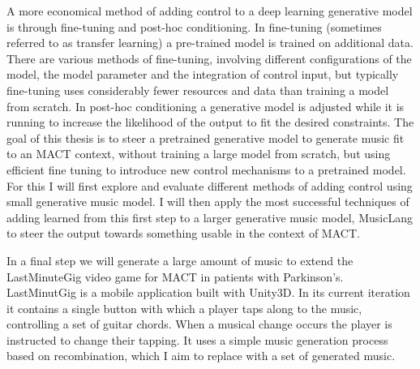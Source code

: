 A more economical method of adding control to a deep learning generative model is through fine-tuning and post-hoc conditioning. In fine-tuning (sometimes referred to as transfer learning) a pre-trained model is trained on additional data. There are various methods of fine-tuning, involving different configurations of the model, the model parameter and  the integration of control input, but typically fine-tuning uses considerably fewer resources and data than training a model from scratch. In post-hoc conditioning a generative model is adjusted while it is running to increase the likelihood of the output to fit the desired constraints. The goal of this thesis is to steer a pretrained generative model to generate music fit to an MACT context, without training a large model from scratch, but using efficient fine tuning to introduce new control mechanisms to a pretrained model. For this I will first explore and evaluate different methods of adding control using small generative music model. I will then apply the most successful techniques of adding learned from this first step to a larger generative music model, MusicLang to steer the output towards something usable in the context of MACT. 

In a final step we will generate a large amount of music to extend the LastMinuteGig video game for MACT in patients with Parkinson's. LastMinutGig is a mobile application built with Unity3D. In its current iteration it contains a single button with which a player taps along to the music, controlling a set of guitar chords. When a musical change occurs the player is instructed to change their tapping. It uses a simple music generation process based on recombination, which I aim to replace with a set of generated music.